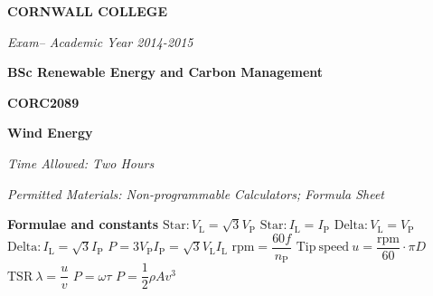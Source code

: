 \documentclass[a4paper,12pt,fleqn]{article}
\newcommand{\institution}{CORNWALL COLLEGE}
\newcommand{\titlehd}{BSc Renewable Energy and Carbon Management}
\newcommand{\examtype}{Exam}
\newcommand{\examdate}{Academic Year 2014-2015}
\newcommand{\examcode}{CORC2089}
\newcommand{\examtitle}{Wind Energy}
\newcommand{\readtime}{15 Minutes}
\newcommand{\writetime}{Two Hours}
\newcommand{\materials}{Non-programmable Calculators; Formula Sheet}
\begin{document}

\begin{center}
\large\textbf{\institution}
\end{center}
\vspace{1cm}

\begin{center}
\textit{ \examtype -- \examdate}
\end{center}
\vspace{1cm}

\begin{center}
\large\textbf{\titlehd}
\end{center}

\begin{center}
\large\textbf{\examcode}
\end{center}
\begin{center}
\large\textbf{\examtitle}
\end{center}
\vspace{4cm}
\vspace{4cm}

\begin{center}
\end{center}
\begin{center}
\textit{Time Allowed:  \writetime}
\end{center}
\begin{center}
\textit{Permitted Materials: \materials}
\end{center}

\newpage
\textbf{Formulae and constants}
\newline\newline
$\mathrm{Star: }V_\mathrm{L}=\sqrt{3}V_\mathrm{P}$
\newline\newline
$\mathrm{Star: }I_\mathrm{L}=I_\mathrm{P}$
\newline\newline
$\mathrm{Delta: }V_\mathrm{L}=V_\mathrm{P}$
\newline\newline
$\mathrm{Delta: }I_\mathrm{L}=\sqrt{3}I_\mathrm{P}$
\newline\newline
$P=3V_\mathrm{P}I_\mathrm{P}=\sqrt{3}V_\mathrm{L}I_\mathrm{L}$
\newline\newline
$\mathrm{rpm}=\dfrac{60f}{n_\mathrm{P}}$
\newline\newline
$\mathrm{Tip\ speed\ }u=\dfrac{\mathrm{rpm}}{60}\cdot\pi D$
\newline\newline
$\mathrm{TSR\ }\lambda=\dfrac{u}{v}$
\newline\newline
$P=\omega\tau$
\newline\newline
$P=\dfrac{1}{2}\rho Av^3$
\end{document}

